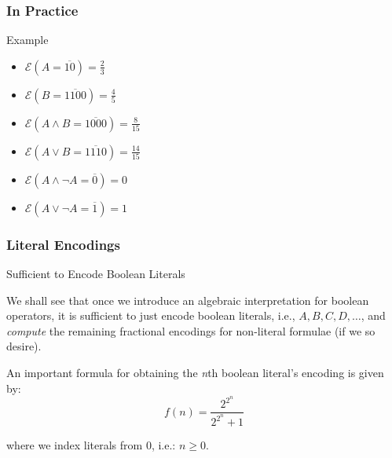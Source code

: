 \documentclass{beamer}
\begin{document}
\begin{frame}
\frametitle{In Practice}
\begin{exampleblock}
{Example} 

\begin{itemize}
\item \(  \mathcal{E}(A  = \overline{10}) = \frac{2}{3} \)
\item \(  \mathcal{E}(B  = \overline{1100}) = \frac{4}{5} \)
\item \(  \mathcal{E}(A \land B  = \overline{1000} ) = \frac{8}{15}\)
\item \(  \mathcal{E}(A \lor B  = \overline{1110} ) = \frac{14}{15}\)
\item \(  \mathcal{E}(A \land \neg A  = \overline{0} ) = 0\)
\item \(  \mathcal{E}(A \lor \neg A  = \overline{1} ) = 1\)
\end{itemize}

\end{exampleblock}
\end{frame}

\begin{frame}
\frametitle{Literal Encodings}
\begin{block}
{Sufficient to Encode Boolean Literals}

We shall see that once we introduce an algebraic interpretation for boolean operators, it is sufficient to just encode boolean literals, i.e., \(A, B, C, D, \ldots\), and \emph{compute} the remaining fractional encodings for non-literal formulae (if we so desire).

An important formula for obtaining the \emph{n}th boolean literal's encoding is given by:
\[
f(n) = \frac{2^{2^n}}{2^{2^n} + 1}
\]

where we index literals from 0, i.e.: \(n \geq 0\).

\end{block}
\end{frame}
\end{document}
